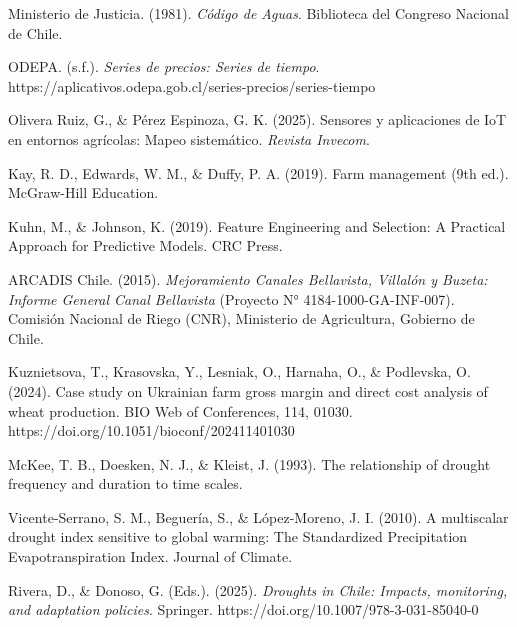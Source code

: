 \documentclass[12pt]{report}
\begin{document}
\begin{thebibliography}{}
\vspace{0.3cm} 
\bibitem{}\hypertarget{ref:codigo1981}{Ministerio de Justicia. (1981). \textit{Código de Aguas}. Biblioteca del Congreso Nacional de Chile.}

\vspace{0.3cm} 
\bibitem{}\hypertarget{ref:odepa}{ODEPA. (s.f.). \textit{Series de precios: Series de tiempo}. https://aplicativos.odepa.gob.cl/series-precios/series-tiempo}

\vspace{0.3cm} 
\bibitem{}\hypertarget{ref:olivera2025}{Olivera Ruiz, G., \& Pérez Espinoza, G. K. (2025). Sensores y aplicaciones de IoT en entornos agrícolas: Mapeo sistemático. \textit{Revista Invecom}.}

\vspace{0.3cm} 
\bibitem{}\hypertarget{ref:kay2019}{Kay, R. D., Edwards, W. M., \& Duffy, P. A. (2019). Farm management (9th ed.). McGraw-Hill Education.}

\vspace{0.3cm} 
\bibitem{}\hypertarget{ref:kuhn2019}{Kuhn, M., \& Johnson, K. (2019). Feature Engineering and Selection: A Practical Approach for Predictive Models. CRC Press.}

\vspace{0.3cm} 
\bibitem{}\hypertarget{ref:arcadis2015}{ARCADIS Chile. (2015). \textit{Mejoramiento Canales Bellavista, Villalón y Buzeta: Informe General Canal Bellavista} (Proyecto N° 4184-1000-GA-INF-007). Comisión Nacional de Riego (CNR), Ministerio de Agricultura, Gobierno de Chile.}
\bibitem{}\hypertarget{ref:kuznietsova2024}{Kuznietsova, T., Krasovska, Y., Lesniak, O., Harnaha, O., \& Podlevska, O. (2024). Case study on Ukrainian farm gross margin and direct cost analysis of wheat production. BIO Web of Conferences, 114, 01030. 
https://doi.org/10.1051/bioconf/202411401030}

\vspace{0.3cm} 
\bibitem{}\hypertarget{ref:mckee1993}{McKee, T. B., Doesken, N. J., \& Kleist, J. (1993). The relationship of drought frequency and duration to time scales.}
\vspace{0.3cm} 
\bibitem{}\hypertarget{ref:vicente2010}{Vicente-Serrano, S. M., Beguería, S., \& López-Moreno, J. I. (2010). A multiscalar drought index sensitive to global warming: The Standardized Precipitation Evapotranspiration Index. Journal of Climate.}
\vspace{0.3cm} 
\bibitem{}\hypertarget{ref:rivera2025}{Rivera, D., \& Donoso, G. (Eds.). (2025). \textit{Droughts in Chile: Impacts, monitoring, and adaptation policies}. Springer. https://doi.org/10.1007/978-3-031-85040-0}


\end{thebibliography}
\end{document}
